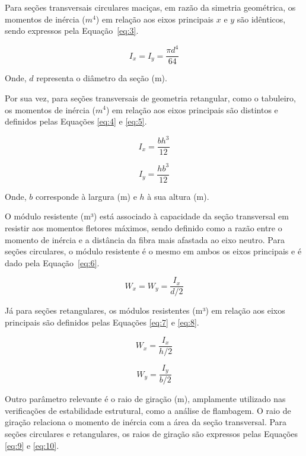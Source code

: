 Para seções transversais circulares maciças, em razão da simetria geométrica, os momentos de inércia ($m^4$) em relação aos eixos principais \(x\) e \(y\) são idênticos, sendo expressos pela Equação~\eqref{eq:3}.

\begin{equation}
I_x = I_y = \frac{\pi d^4}{64}
\label{eq:3}
\end{equation}

Onde, \(d\) representa o diâmetro da seção (m).

Por sua vez, para seções transversais de geometria retangular, como o tabuleiro, os momentos de inércia ($m^4$) em relação aos eixos principais são distintos e definidos pelas Equações \eqref{eq:4} e \eqref{eq:5}.

\begin{equation}
I_x = \frac{b h^3}{12}
\label{eq:4}
\end{equation}

\begin{equation}
I_y = \frac{h b^3}{12}
\label{eq:5}
\end{equation}

Onde, \(b\) corresponde à largura (m)  e \(h\) à sua altura (m).

O módulo resistente (m³) está associado à capacidade da seção transversal em resistir aos momentos fletores máximos, sendo definido como a razão entre o momento de inércia e a distância da fibra mais afastada ao eixo neutro. Para seções circulares, o módulo resistente é o mesmo em ambos os eixos principais e é dado pela Equação~\eqref{eq:6}.

\begin{equation}
W_x = W_y = \frac{I_x}{d/2}
\label{eq:6}
\end{equation}

Já para seções retangulares, os módulos resistentes (m³) em relação aos eixos principais são definidos pelas Equações \eqref{eq:7} e \eqref{eq:8}.

\begin{equation}
W_x = \frac{I_x}{h/2}
\label{eq:7}
\end{equation}

\begin{equation}
W_y = \frac{I_y}{b/2}
\label{eq:8}
\end{equation}

Outro parâmetro relevante é o raio de giração (m), amplamente utilizado nas verificações de estabilidade estrutural, como a análise de flambagem. O raio de giração relaciona o momento de inércia com a área da seção transversal. Para seções circulares e retangulares, os raios de giração são expressos pelas Equações \eqref{eq:9} e \eqref{eq:10}.

